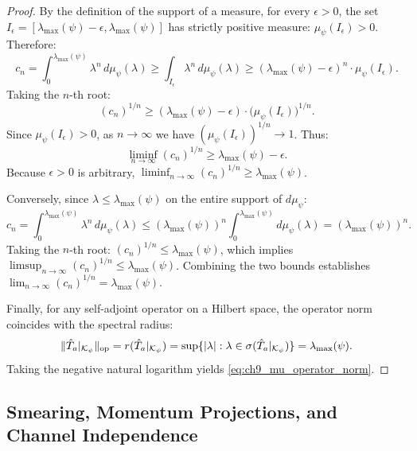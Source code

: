 \begin{proof}
By the definition of the support of a measure, for every $\epsilon > 0$, the set $I_\epsilon = [\lambda_{\max}(\psi) - \epsilon, \lambda_{\max}(\psi)]$ has strictly positive measure: $\mu_\psi(I_\epsilon) > 0$. Therefore:
\begin{equation}
c_n = \int_0^{\lambda_{\max}(\psi)} \lambda^n \, d\mu_\psi(\lambda) \ge \int_{I_\epsilon} \lambda^n \, d\mu_\psi(\lambda) \ge (\lambda_{\max}(\psi) - \epsilon)^n \cdot \mu_\psi(I_\epsilon).
\end{equation}
Taking the $n$-th root:
\begin{equation}
(c_n)^{1/n} \ge (\lambda_{\max}(\psi) - \epsilon) \cdot \bigl( \mu_\psi(I_\epsilon) \bigr)^{1/n}.
\end{equation}
Since $\mu_\psi(I_\epsilon) > 0$, as $n \to \infty$ we have $(\mu_\psi(I_\epsilon))^{1/n} \to 1$. Thus:
\begin{equation}
\liminf_{n \to \infty} (c_n)^{1/n} \ge \lambda_{\max}(\psi) - \epsilon.
\end{equation}
Because $\epsilon > 0$ is arbitrary, $\liminf_{n \to \infty} (c_n)^{1/n} \ge \lambda_{\max}(\psi)$.

Conversely, since $\lambda \le \lambda_{\max}(\psi)$ on the entire support of $d\mu_\psi$:
\begin{equation}
c_n = \int_0^{\lambda_{\max}(\psi)} \lambda^n \, d\mu_\psi(\lambda) \le (\lambda_{\max}(\psi))^n \int_0^{\lambda_{\max}(\psi)} d\mu_\psi(\lambda) = (\lambda_{\max}(\psi))^n.
\end{equation}
Taking the $n$-th root: $(c_n)^{1/n} \le \lambda_{\max}(\psi)$, which implies $\limsup_{n \to \infty} (c_n)^{1/n} \le \lambda_{\max}(\psi)$.
Combining the two bounds establishes $\lim_{n \to \infty} (c_n)^{1/n} = \lambda_{\max}(\psi)$.

Finally, for any self-adjoint operator on a Hilbert space, the operator norm coincides with the spectral radius:
\begin{equation}
\|\hat{T}_a|_{\mathcal{K}_\psi}\|_{\mathrm{op}} = r(\hat{T}_a|_{\mathcal{K}_\psi}) = \sup \{ |\lambda| : \lambda \in \sigma(\hat{T}_a|_{\mathcal{K}_\psi}) \} = \lambda_{\max}(\psi).
\end{equation}
Taking the negative natural logarithm yields \eqref{eq:ch9_mu_operator_norm}.
\end{proof}

\subsection{Smearing, Momentum Projections, and Channel Independence}
\label{subsec:channel_independence}

